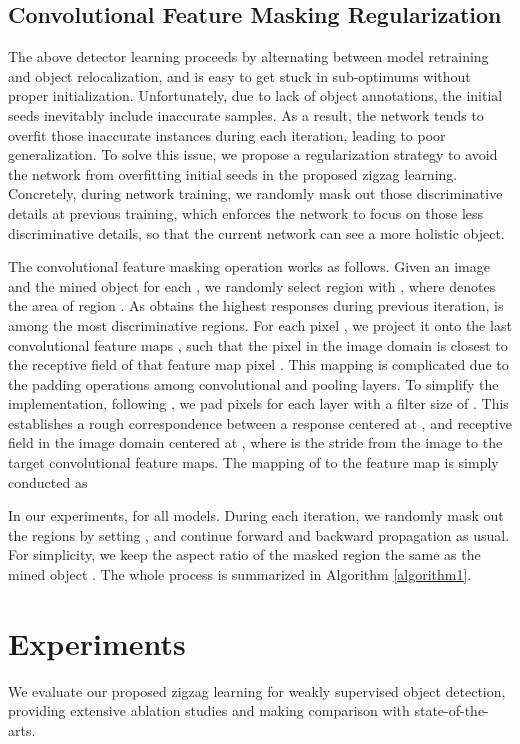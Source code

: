 \documentclass[10pt,twocolumn,letterpaper]{article}
\begin{document}
\subsection{Convolutional Feature Masking Regularization}
The above detector learning proceeds by alternating between model retraining and object relocalization, and is easy to get stuck in sub-optimums without proper initialization. Unfortunately, due to lack of object annotations, the initial seeds inevitably include inaccurate samples. As a result, the network tends to overfit those inaccurate instances during each iteration, leading to poor generalization. To solve this issue, we propose a regularization strategy to avoid the network from overfitting initial seeds in the proposed zigzag learning. Concretely, during network training, we randomly mask out those discriminative details at previous training, which enforces the network to focus on those less discriminative details, so that the current network can see a more holistic object.

The convolutional feature masking operation works as follows. Given an image  and the mined object  for each , we randomly select region  with , where  denotes the area of region . As  obtains the highest responses during previous iteration,  is among the most discriminative regions. For each pixel , we project it onto the last convolutional feature maps , such that the pixel  in the image domain is closest to the receptive field of that feature map pixel . This mapping is complicated due to the padding operations among convolutional and pooling layers. To simplify the implementation, following \cite{he2014spatial}, we pad  pixels for each layer with a filter size of . This establishes a rough correspondence between a response centered at , and receptive field in the image domain centered at , where  is the stride from the image to the target convolutional feature maps. The mapping of  to the feature map  is simply conducted as

In our experiments,  for all models. During each iteration, we randomly mask out the regions by setting , and continue forward and backward propagation as usual. For simplicity, we keep the aspect ratio of the masked region  the same as the mined object . The whole process is summarized in Algorithm \ref{algorithm1}.


\section{Experiments}
We evaluate our proposed zigzag learning for weakly supervised object detection, providing extensive ablation studies and making comparison with state-of-the-arts.
\end{document}
